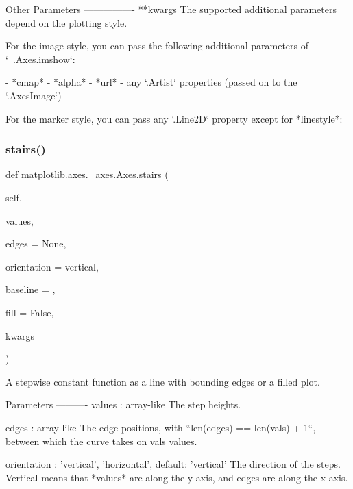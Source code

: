\begin{DoxyVerb}
\begin{DoxyVerb}
Other Parameters
----------------
**kwargs
    The supported additional parameters depend on the plotting style.

    For the image style, you can pass the following additional
    parameters of `~.Axes.imshow`:

    - *cmap*
    - *alpha*
    - *url*
    - any `.Artist` properties (passed on to the `.AxesImage`)

    For the marker style, you can pass any `.Line2D` property except
    for *linestyle*:

\end{DoxyVerb}
 \mbox{\label{classmatplotlib_1_1axes_1_1__axes_1_1Axes_a658809a0ca28b321c27d6853b50ecc4e}} 
\subsubsection{\texorpdfstring{stairs()}{stairs()}}
{\footnotesize\ttfamily def matplotlib.\+axes.\+\_\+axes.\+Axes.\+stairs (\begin{DoxyParamCaption}\item[{}]{self,  }\item[{}]{values,  }\item[{}]{edges = {\ttfamily None},  }\item[{}]{orientation = {\ttfamily \textquotesingle{}vertical\textquotesingle{}},  }\item[{}]{baseline = {},  }\item[{}]{fill = {\ttfamily False},  }\item[{}]{kwargs }\end{DoxyParamCaption})}

\begin{DoxyVerb}A stepwise constant function as a line with bounding edges
or a filled plot.

Parameters
----------
values : array-like
    The step heights.

edges : array-like
    The edge positions, with ``len(edges) == len(vals) + 1``,
    between which the curve takes on vals values.

orientation : {'vertical', 'horizontal'}, default: 'vertical'
    The direction of the steps. Vertical means that *values* are along
    the y-axis, and edges are along the x-axis.


\end{DoxyVerb}
\end{DoxyVerb}
